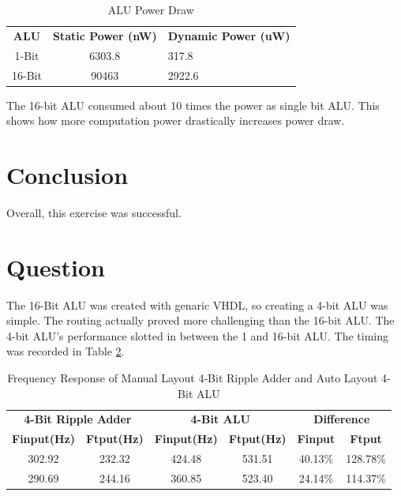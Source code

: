 \documentclass[11pt]{article}
\begin{document}
		\begin{table}[H]
			\centering
			\caption{ALU Power Draw}
			\label{tab:ALU-power}
			\begin{tabular}{ccl}
				\textbf{ALU} & \textbf{Static Power (nW)} & \textbf{Dynamic Power (uW)} \\
				1-Bit        & 6303.8                     & 317.8                       \\
				16-Bit       & 90463                      & 2922.6                     
			\end{tabular}
		\end{table}
	
		The 16-bit ALU consumed about 10 times the power as single bit ALU. This shows how more computation power drastically increases power draw. 
			

\section{Conclusion}
	Overall, this exercise was successful.

\section{Question}

	The 16-Bit ALU was created with genaric VHDL, so creating a 4-bit ALU was simple. The routing actually proved more challenging than the 16-bit ALU. The 4-bit ALU's performance slotted in between the 1 and 16-bit ALU. The timing was recorded in Table \ref{tab:Question-Freq}.

	\begin{table}[H]
		\centering
		\caption{Frequency Response of Manual Layout 4-Bit Ripple Adder and Auto Layout 4-Bit ALU}
		\label{tab:Question-Freq}
		\begin{tabular}{|cc|cc|cc|}
			\hline
			\multicolumn{2}{|c}{\textbf{4-Bit Ripple Adder}}          & \multicolumn{2}{|c|}{\textbf{4-Bit ALU}}                   & \multicolumn{2}{c|}{\textbf{Difference}}        \\
			\textbf{Finput(Hz)} & \textbf{Ftput(Hz)} & \textbf{Finput(Hz)} & \textbf{Ftput(Hz)} & \textbf{Finput} & \textbf{Ftput} \\
			\hline
			302.92                   & 232.32                        & 424.48                   & 531.51                        & 40.13\%             & 128.78\%                 \\
			290.69                   & 244.16                        & 360.85                   & 523.40                        & 24.14\%             & 114.37\%                 \\
			\hline
		\end{tabular}
	\end{table}
\end{document}

